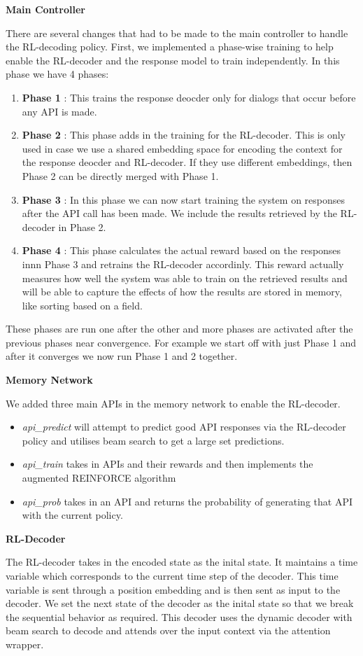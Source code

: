 \noindent\textbf{Main Controller}

There are several changes that had to be made to the main controller to handle the RL-decoding policy. First, we implemented a phase-wise training to help enable the RL-decoder and the response model to train independently. In this phase we have 4 phases:
\begin{enumerate}
	\item \textbf{Phase 1} : This trains the response deocder only for dialogs that occur before any API is made.
	\item \textbf{Phase 2} : This phase adds in the training for the RL-decoder. This is only used in case we use a shared embedding space for encoding the context for the response deocder and RL-decoder. If they use different embeddings, then Phase 2 can be directly merged with Phase 1.
	\item \textbf{Phase 3} : In this phase we can now start training the system on responses after the API call has been made. We include the results retrieved by the RL-decoder in Phase 2.
	\item \textbf{Phase 4} : This phase calculates the actual reward based on the responses innn Phase 3 and retrains the RL-decoder accordinly. This reward actually measures how well the system was able to train on the retrieved results and will be able to capture the effects of how the results are stored in memory, like sorting based on a field.
\end{enumerate}

These phases are run one after the other and more phases are activated after the previous phases near convergence. For example we start off with just Phase 1 and after it converges we now run Phase 1 and 2 together.

\noindent\textbf{Memory Network}

We added three main APIs in the memory network to enable the RL-decoder. 

\begin{itemize}
	\item \emph{api\_predict} will attempt to predict good API responses via the RL-decoder policy and utilises beam search to get a large set predictions.
	\item \emph{api\_train} takes in APIs and their rewards and then implements the augmented REINFORCE algorithm
	\item \emph{api\_prob} takes in an API and returns the probability of generating that API with the current policy.
\end{itemize}

\noindent\textbf{RL-Decoder}

The RL-decoder takes in the encoded state as the inital state. It maintains a time variable which corresponds to the current time step of the decoder. This time variable is sent through a position embedding and is then sent as input to the decoder. We set the next state of the decoder as the inital state so that we break the sequential behavior as required. This decoder uses the dynamic decoder with beam search to decode and attends over the input context via the attention wrapper.
